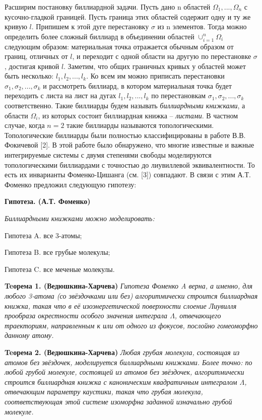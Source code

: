 Расширим постановку биллиардной задачи. Пусть дано n областей $\Omega_1, ... ,\Omega_n$ с кусочно-гладкой границей. Пусть граница этих областей содержит одну и ту же кривую $ l $. Припишем к этой дуге перестановку $ \sigma $ из n элементов. Тогда можно определить более сложный биллиард в объединении областей $\cup_{i = 1}^n \Omega_i$ следующим образом: материальная точка отражается обычным образом от границ, отличных от $ l $, и переходит с одной области на другую по перестановке $ \sigma $, достигая кривой $ l $. Заметим, что общих граничных кривых у областей может быть несколько: $ l_1, l_2, ..., l_k $. Ко всем им можно приписать перестановки $ \sigma_1, \sigma_2, ..., \sigma_k $  и рассмотреть биллиард, в котором материальная точка будет переходить с листа на лист на дугах $ l_1, l_2, ..., l_k $ по перестановкам $ \sigma_1, \sigma_2, ..., \sigma_k $ соответственно. Такие биллиарды будем называть \textit{биллиардными книжками}, а области $ \Omega_i $,  из которых состоит биллиардная книжка -- \textit{листами}. В частном случае, когда $ n = 2 $ такие биллиарды называются топологическими. Топологические биллиарды были полностью классифицированы в работе В.В.\,Фокичевой [2]. В этой работе было обнаружено, что многие известные и важные интегрируемые системы с двумя степенями свободы моделируются топологическими  биллиардами с точностью до лиувиллевой эквивалентности. То есть их инварианты Фоменко-Цишанга (см. [3]) совпадают. В связи с этим А.Т.\,Фоменко предложил следующую гипотезу:

\textbf{Гипотеза. (А.Т. Фоменко)}
{\it Биллиардными книжками можно моделировать:
	
	Гипотеза A. все 3-атомы;
	
	Гипотеза B. все грубые молекулы;
	
	Гипотеза C. все меченые молекулы.
}

\textbf{Teорема 1. (Ведюшкина-Харчева)}  {\it Гипотеза Фоменко A верна, а именно, для любого 3-атома (со звёздочками или без) алгоритмически строится биллиардная книжка, такая что в её изоэнергетической поверхности слоение Лиувилля прообраза окрестности особого значения интеграла $ \Lambda $, отвечающего траекториям, направленным к или от одного из фокусов, послойно гомеоморфно данному атому.}

\textbf{Teорема 2. (Ведюшкина-Харчева)}  {\it Любая грубая молекула, состоящая из атомов без звёздочек, моделируется биллиардными книжками. Более точно: по любой грубой молекуле, состоящей из атомов без звёздочек, алгоритмически строится биллиардная книжка с каноническим квадратичным интегралом $ \Lambda $, отвечающим параметру каустики, такая что грубая молекула, соответствующая этой системе изоморфна заданной изначально грубой молекуле.}



